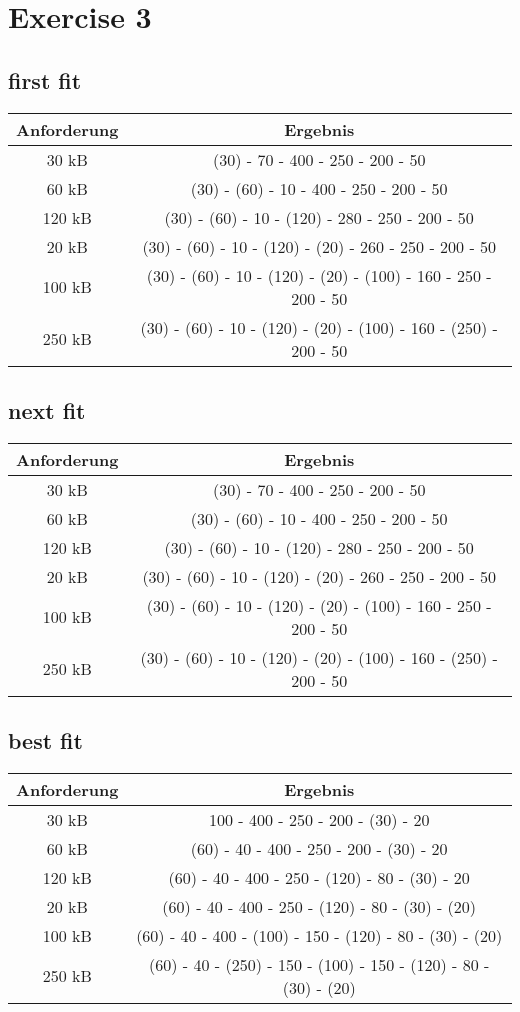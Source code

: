 \documentclass[10pt,a4paper]{article}
\begin{document}
\section*{Exercise 3}

\subsection*{first fit}

\begin{tabular}{c|c}
  Anforderung & Ergebnis\\\hline
  30 kB & (30) - 70 - 400 - 250 - 200 - 50\\
  60 kB & (30) - (60) - 10 - 400 - 250 - 200 - 50\\
  120 kB & (30) - (60) - 10 - (120) - 280 - 250 - 200 - 50\\
  20 kB & (30) - (60) - 10 - (120) - (20) - 260 - 250 - 200 - 50\\
  100 kB & (30) - (60) - 10 - (120) - (20) - (100) - 160 - 250 - 200 - 50\\
  250 kB & (30) - (60) - 10 - (120) - (20) - (100) - 160 - (250) - 200 - 50
\end{tabular}

\subsection*{next fit}

\begin{tabular}{c|c}
  Anforderung & Ergebnis\\\hline
  30 kB & (30) - 70 - 400 - 250 - 200 - 50\\
  60 kB & (30) - (60) - 10 - 400 - 250 - 200 - 50\\
  120 kB & (30) - (60) - 10 - (120) - 280 - 250 - 200 - 50\\
  20 kB & (30) - (60) - 10 - (120) - (20) - 260 - 250 - 200 - 50\\
  100 kB & (30) - (60) - 10 - (120) - (20) - (100) - 160 - 250 - 200 - 50\\
  250 kB & (30) - (60) - 10 - (120) - (20) - (100) - 160 - (250) - 200 - 50
\end{tabular}

\subsection*{best fit}

\begin{tabular}{c|c}
  Anforderung & Ergebnis\\\hline
  30 kB & 100 - 400 - 250 - 200 - (30) - 20\\
  60 kB & (60) - 40 - 400 - 250 - 200 - (30) - 20\\
  120 kB & (60) - 40 - 400 - 250 - (120) - 80 - (30) - 20\\
  20 kB & (60) - 40 - 400 - 250 - (120) - 80 - (30) - (20)\\
  100 kB & (60) - 40 - 400 - (100) - 150 - (120) - 80 - (30) - (20)\\
  250 kB & (60) - 40 - (250) - 150 - (100) - 150 - (120) - 80 - (30) - (20)
\end{tabular}
\end{document}
